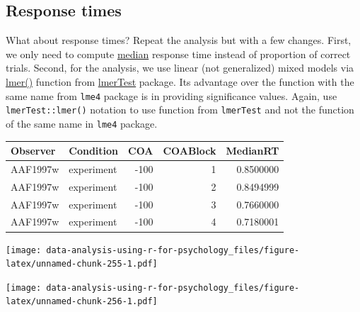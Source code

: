 \documentclass[
]{book}
\begin{document}
\hypertarget{response-times}{%
\subsection*{Response times}\label{response-times}}

What about response times? Repeat the analysis but with a few changes. First, we only need to compute \href{https://stat.ethz.ch/R-manual/R-devel/library/stats/html/median.html}{median} response time instead of proportion of correct trials. Second, for the analysis, we use linear (not generalized) mixed models via \href{https://www.rdocumentation.org/packages/lmerTest/versions/2.0-36/topics/lmer}{lmer()} function from \href{https://github.com/runehaubo/lmerTestR}{lmerTest} package. Its advantage over the function with the same name from \texttt{lme4} package is in providing significance values. Again, use \texttt{lmerTest::lmer()} notation to use function from \texttt{lmerTest} and not the function of the same name in \texttt{lme4} package.

\begin{tabular}{l|l|r|r|r}
\hline
Observer & Condition & COA & COABlock & MedianRT\\
\hline
AAF1997w & experiment & -100 & 1 & 0.8500000\\
\hline
AAF1997w & experiment & -100 & 2 & 0.8494999\\
\hline
AAF1997w & experiment & -100 & 3 & 0.7660000\\
\hline
AAF1997w & experiment & -100 & 4 & 0.7180001\\
\hline
\end{tabular}

\texttt{[image: data-analysis-using-r-for-psychology\_files/figure-latex/unnamed-chunk-255-1.pdf]}

\texttt{[image: data-analysis-using-r-for-psychology\_files/figure-latex/unnamed-chunk-256-1.pdf]}
\end{document}
